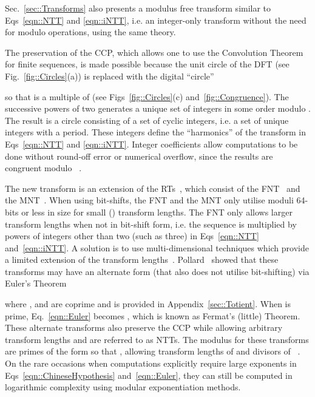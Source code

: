 \documentclass[twocolumn]{IEEEtran}
\newcommand{\eqnTag}{Eq.}
\newcommand{\eqnsTag}{Eqs}
\newcommand{\figTag}{Fig.}
\newcommand{\figsTag}{Figs}
\newcommand{\secTag}{Sec.}
\begin{document}
\secTag~\ref{sec::Transforms} also presents a modulus free transform similar to \eqnsTag~\eqref{eqn::NTT} and \eqref{eqn::iNTT}, i.e. an integer-only transform without the need for modulo operations, using the same theory.

The preservation of the \ac{CCP}, which allows one to use the Convolution Theorem for finite sequences, is made possible because the unit circle of the \ac{DFT} (see \figTag~\ref{fig::Circles}(a)) is replaced with the digital ``circle''

so that  is a multiple of  (see \figsTag~\ref{fig::Circles}(c) and~\ref{fig::Congruence}). The successive powers  of two generates a unique set of integers in some order modulo . The result is a circle consisting of a set of cyclic integers, i.e. a set of unique integers with a period. These integers define the ``harmonics'' of the transform in \eqnsTag~\eqref{eqn::NTT} and \eqref{eqn::iNTT}. Integer coefficients allow computations to be done without round-off error or numerical overflow, since the results are congruent modulo ~\citep{Nussbaumer1978}.

The new transform is an extension of the \acp{RT}~\citep{Agarwal1974}, which consist of the \ac{FNT}~\citep{Schonhage1971} and the \ac{MNT}~\citep{Rader1972}. When using bit-shifts, the \ac{FNT} and the \ac{MNT} only utilise moduli 64-bits or less in size for small () transform lengths. The \ac{FNT} only allows larger transform lengths when not in bit-shift form, i.e. the sequence is multiplied by powers of integers other than two (such as three) in \eqnsTag~\eqref{eqn::NTT} and~\eqref{eqn::iNTT}. A solution is to use multi-dimensional techniques which provide a limited extension of the transform lengths~\citep{Agarwal1974a}. Pollard~\citep{Pollard1971} showed that these transforms may have an alternate form (that also does not utilise bit-shifting) via Euler's Theorem

where ,  and  are coprime and  is provided in Appendix~\ref{sec::Totient}. When  is prime, \eqnTag~\eqref{eqn::Euler} becomes , which is known as Fermat's (little) Theorem. These alternate transforms also preserve the \ac{CCP} while allowing arbitrary transform lengths and are referred to as \acp{NTT}. The modulus  for these transforms are primes of the form  so that , allowing transform lengths of  and divisors of ~\citep{Bhattacharya2000}. On the rare occasions when computations explicitly require large exponents in \eqnsTag~\eqref{eqn::ChineseHypothesis} and~\eqref{eqn::Euler}, they can still be computed in logarithmic complexity using modular exponentiation methods.
\end{document}
